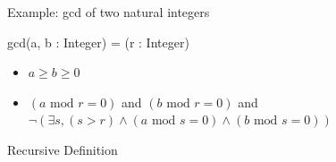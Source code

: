 \begin{frame}{Example: gcd of two natural integers}
  \bigskip

  \begin{block}{gcd(a, b : Integer) = (r : Integer)}
    \begin{itemize}
    \item {} $a\geq b\geq  0$
    \item {}
      $(a\text{ mod }r = 0)$ and $(b\text{ mod }r = 0)$ and
      $\neg\left(\exists s, (s > r)\wedge(a\text{ mod }s = 0)\wedge(b\text{ mod }s = 0)\right)$

    \end{itemize}
  \end{block}

  \begin{block}{Recursive Definition}\medskip
    \centerline{}
  \end{block}
\end{frame}
